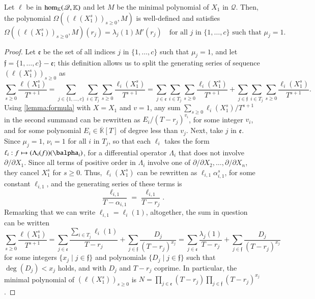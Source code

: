 \documentclass[final,1p,times,authoryear]{elsarticle}
\newcommand{\lf}{X}
\newcommand{\residueI}{\mathscr{Q}}
\def\K{\mathbb{K}}
\def\K {\ensuremath{\mathbb{K}}}
\def\Kbar {{\ensuremath{\overline{\mathbb{K}}}}}
\begin{document}
\begin{lemma}\label{lemma:valuelambda}
  Let $\ell$ be in ${\rm hom}_\K(\residueI,\K)$ and let $M$ be the minimal
  polynomial of $X_1$ in $\residueI$. Then, the polynomial
  $\Omega((\ell(X_1^s))_{s\ge0},M)$ is well-defined and satisfies
  $$\Omega((\ell(X_1^s))_{s\ge0},M)(r_j) = \lambda_j(1) M'(r_j) \quad \text{for all $j$ in $\{1,\dots,c\}$ such that $\mu_j=1$.}$$
\end{lemma}
\begin{proof}
  Let $\mathfrak{e}$ be the set of all indices $j$ in $\{1,\dots,c\}$
  such that $\mu_j=1$, and let $\mathfrak{f}=\{1,\dots,c\}-\mathfrak{e}$;
  this definition allows us to split the generating series
  of sequence $(\ell(X_1^s))_{s\ge 0}$ as
  \[
    \sum_{s \ge 0} \frac{\ell(X_1^s)}{T^{s+1}  }
  = \sum_{j \in \{1,\dots,c\}}\sum_{i\in T_j} 
  \sum_{s \ge 0} \frac{\ell_i(X_1^s)}{T^{s+1}} 
  =\sum_{j \in \mathfrak{e}}\sum_{i\in T_j}\sum_{s \ge 0}  \frac{\ell_i(X_1^s)}{T^{s+1}} +
  \sum_{j \in \mathfrak{f}}\sum_{i\in T_j}\sum_{s \ge 0}  \frac{\ell_i(X_1^s)}{T^{s+1}}.
  \]
  Using \cref{lemma:formula} with $\lf=X_1$ and $v=1$, any sum $\sum_{s \ge 0} \ell_i(X_1^s)/T^{s+1}$ 
  in the second summand
  can be rewritten as 
  $E_i/(T-r_j)^{v_i}$,
  for some integer $v_i$, and for some polynomial $E_i \in \Kbar[T]$ of degree less than
  $v_j$. Next, take $j$ in $\mathfrak{e}$. Since $\mu_j=1$, $\nu_i=1$ for all $i$ in $T_j$,
  so that
  each $\ell_i$ takes the form 
  $\ell_i: f \mapsto (\Lambda_{i}(f))(\balpha_i)$, 
  for a differential operator $\Lambda_{i}$ that does not involve $\partial/\partial
  X_1$. Since all terms of positive order in $\Lambda_i$ involve one of
  $\partial/\partial X_2,\dots,\partial/\partial X_n$, they cancel
  $X_1^s$ for $s\ge 0$. Thus, $\ell_i(X_1^s)$ can be rewritten 
  as $\ell_{i,1} \alpha_{i,1}^s$, for some constant $\ell_{i,1}$,
  and the generating series of these terms is 
  $$\frac {\ell_{i,1}}{T-\alpha_{i,1}}=\frac {\ell_{i,1}}{T-r_j}.$$
  Remarking  that we can write $\ell_{i,1}=\ell_i(1)$,
  altogether, the sum in question can be written
  \[
    \sum_{s \ge 0} \frac{\ell(X_1^s)}{T^{s+1}  }
  =\sum_{j \in \mathfrak{e}} 
  \frac{ \sum_{i\in T_j}  \ell_{i}(1) }{T-r_j }
  + \sum_{j \in \mathfrak{f}} \frac{D_j}{(T-r_j )^{x_j}}
  = \sum_{j \in \mathfrak{e}} 
  \frac{ \lambda_j(1) }{T-r_j }
  + \sum_{j \in \mathfrak{f}} \frac{D_j}{(T-r_j )^{x_j}}
  \]
  for some integers $\{x_j \mid j \in \mathfrak{f}\}$ and
  polynomials $\{D_j \mid j \in \mathfrak{f}\}$ such that
  $\deg(D_j) < x_j$ holds, and with $D_j$ and $T-r_j $
  coprime. In particular, the minimal polynomial of  $(\ell(X_1^s))_{s\ge 0}$ is $N=\prod_{j\in
  \mathfrak{e}}(T-r_j) \prod_{j \in  \mathfrak{f}}(T-r_j)^{x_j}$.


\end{proof}
\end{document}
